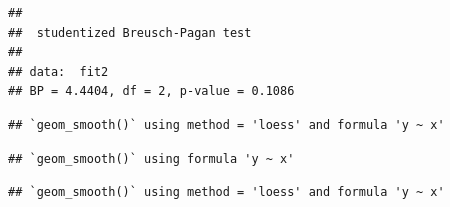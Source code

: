 \documentclass{article}
\begin{document}
\begin{verbatim}
## 
##  studentized Breusch-Pagan test
## 
## data:  fit2
## BP = 4.4404, df = 2, p-value = 0.1086
\end{verbatim}

\begin{verbatim}
## `geom_smooth()` using method = 'loess' and formula 'y ~ x'
\end{verbatim}

\begin{verbatim}
## `geom_smooth()` using formula 'y ~ x'
\end{verbatim}

\begin{verbatim}
## `geom_smooth()` using method = 'loess' and formula 'y ~ x'
\end{verbatim}
\end{document}
